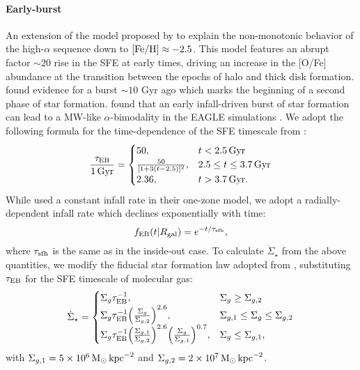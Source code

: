 \documentclass[twocolumn,twocolappendix,linenumbers]{aastex631}
\begin{document}
\paragraph{Early-burst} An extension of the model proposed by \citet{Conroy2022-ThickDisk} to explain the non-monotonic behavior of the high-$\alpha$ sequence down to ${\rm [Fe/H]}\approx-2.5$. This model features an abrupt factor $\sim20$ rise in the SFE at early times, driving an increase in the [O/Fe] abundance at the transition between the epochs of halo and thick disk formation. \citet{Stahlholdt2022-StarFormationEpochs} found evidence for a burst $\sim10$ Gyr ago which marks the beginning of a second phase of star formation. \citet{Mackereth2018-AlphaBimodality} found that an early infall-driven burst of star formation can lead to a MW-like $\alpha$-bimodality in the EAGLE simulations \citep{Crain2015-EAGLE,Schaye2015-EAGLE}. We adopt the following formula for the time-dependence of the SFE timescale from \citet{Conroy2022-ThickDisk}:
\begin{equation}
    \frac{\tau_{\rm EB}}{1\,\rm{Gyr}} =
    \begin{cases}
        50, & t < 2.5\,\rm{Gyr} \\
        \frac{50}{[1+3(t-2.5)]^2}, & 2.5\leq t \leq 3.7\,\rm{Gyr} \\
        2.36, & t > 3.7\,\rm{Gyr}.
    \end{cases}
    \label{eq:earlyburst-taustar}
\end{equation}
While \citet{Conroy2022-ThickDisk} used a constant infall rate in their one-zone model, we adopt a radially-dependent infall rate which declines exponentially with time:
\begin{equation}
    f_{\rm EB}(t|R_{\rm gal}) = e^{-t/\tau_{\rm sfh}},
    \label{eq:earlyburst-ifr}
\end{equation}
where $\tau_{\rm sfh}$ is the same as in the inside-out case.
To calculate $\dot \Sigma_\star$ from the above quantities, we modify the fiducial star formation law adopted from , substituting $\tau_{\rm EB}$ for the SFE timescale of molecular gas:
\begin{equation}
    \dot \Sigma_\star = 
    \begin{cases}
        \Sigma_g \tau_{\rm EB}^{-1}, & \Sigma_g \geq \Sigma_{g,2} \\
        \Sigma_g \tau_{\rm EB}^{-1} \Big(\frac{\Sigma_g}{\Sigma_{g,2}}\Big)^{2.6}, & \Sigma_{g,1} \leq \Sigma_g \leq \Sigma_{g,2} \\
        \Sigma_g \tau_{\rm EB}^{-1} \Big(\frac{\Sigma_{g,1}}{\Sigma_{g,2}}\Big)^{2.6} \Big(\frac{\Sigma_g}{\Sigma_{g,1}}\Big)^{0.7}, & \Sigma_g \leq \Sigma_{g,1},
    \end{cases}
    \label{eq:earlyburst-sfr}
\end{equation}
with $\Sigma_{g,1}=5\times 10^6\,{\rm M}_\odot\,{\rm kpc}^{-2}$ and $\Sigma_{g,2}=2\times 10^7\,{\rm M}_\odot\,{\rm kpc}^{-2}$.
\end{document}
